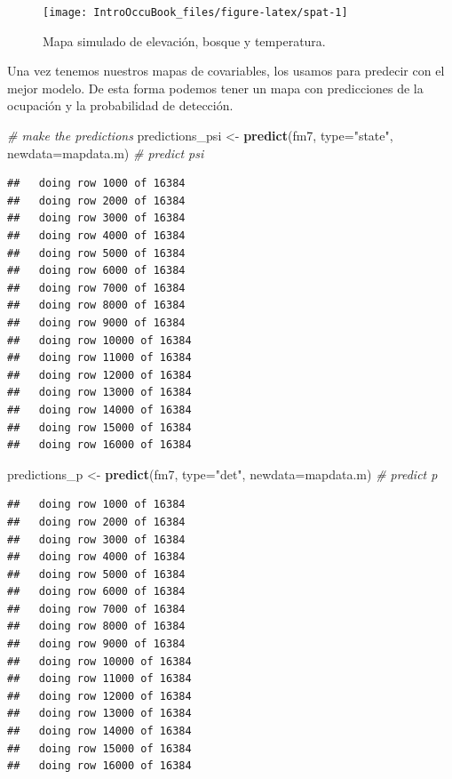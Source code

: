\documentclass[
]{book}
\newenvironment{Shaded}{\begin{snugshade}}{\end{snugshade}}
\newcommand{\CommentTok}[1]{\textcolor[rgb]{0.56,0.35,0.01}{\textit{#1}}}
\newcommand{\DataTypeTok}[1]{\textcolor[rgb]{0.13,0.29,0.53}{#1}}
\newcommand{\KeywordTok}[1]{\textcolor[rgb]{0.13,0.29,0.53}{\textbf{#1}}}
\newcommand{\NormalTok}[1]{#1}
\newcommand{\StringTok}[1]{\textcolor[rgb]{0.31,0.60,0.02}{#1}}
\begin{document}
\begin{figure}
\texttt{[image: IntroOccuBook\_files/figure-latex/spat-1]} \caption[fig]{Mapa simulado de elevación, bosque y temperatura.}\label{fig:spat}
\end{figure}

Una vez tenemos nuestros mapas de covariables, los usamos para predecir con el mejor modelo. De esta forma podemos tener un mapa con predicciones de la ocupación y la probabilidad de detección.

\begin{Shaded}
\begin{Highlighting}[]
\CommentTok{# make the predictions }
\NormalTok{predictions_psi <-}\StringTok{ }\KeywordTok{predict}\NormalTok{(fm7, }\DataTypeTok{type=}\StringTok{"state"}\NormalTok{, }\DataTypeTok{newdata=}\NormalTok{mapdata.m) }\CommentTok{# predict psi}
\end{Highlighting}
\end{Shaded}

\begin{verbatim}
##   doing row 1000 of 16384
##   doing row 2000 of 16384
##   doing row 3000 of 16384
##   doing row 4000 of 16384
##   doing row 5000 of 16384
##   doing row 6000 of 16384
##   doing row 7000 of 16384
##   doing row 8000 of 16384
##   doing row 9000 of 16384
##   doing row 10000 of 16384
##   doing row 11000 of 16384
##   doing row 12000 of 16384
##   doing row 13000 of 16384
##   doing row 14000 of 16384
##   doing row 15000 of 16384
##   doing row 16000 of 16384
\end{verbatim}

\begin{Shaded}
\begin{Highlighting}[]
\NormalTok{predictions_p   <-}\StringTok{ }\KeywordTok{predict}\NormalTok{(fm7, }\DataTypeTok{type=}\StringTok{"det"}\NormalTok{,   }\DataTypeTok{newdata=}\NormalTok{mapdata.m) }\CommentTok{# predict p}
\end{Highlighting}
\end{Shaded}

\begin{verbatim}
##   doing row 1000 of 16384
##   doing row 2000 of 16384
##   doing row 3000 of 16384
##   doing row 4000 of 16384
##   doing row 5000 of 16384
##   doing row 6000 of 16384
##   doing row 7000 of 16384
##   doing row 8000 of 16384
##   doing row 9000 of 16384
##   doing row 10000 of 16384
##   doing row 11000 of 16384
##   doing row 12000 of 16384
##   doing row 13000 of 16384
##   doing row 14000 of 16384
##   doing row 15000 of 16384
##   doing row 16000 of 16384
\end{verbatim}
\end{document}
